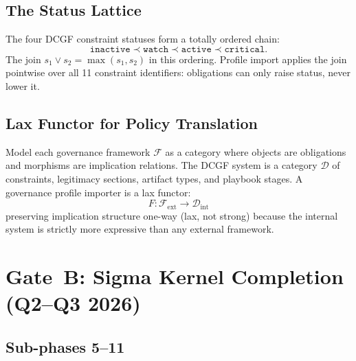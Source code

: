 \documentclass[11pt,letterpaper]{article}
\theoremstyle{remark}
\begin{document}
\subsection{The Status Lattice}

The four DCGF constraint statuses form a totally ordered chain:
\begin{equation}
  \texttt{inactive} \prec \texttt{watch} \prec \texttt{active} \prec \texttt{critical}.
  \label{eq:lattice}
\end{equation}
The join $s_1 \vee s_2 = \max(s_1, s_2)$ in this ordering. Profile
import applies the join pointwise over all 11 constraint identifiers:
obligations can only raise status, never lower it.

\subsection{Lax Functor for Policy Translation}

Model each governance framework $\mathcal{F}$ as a category where objects
are obligations and morphisms are implication relations. The DCGF system
is a category $\mathcal{D}$ of constraints, legitimacy sections, artifact
types, and playbook stages. A governance profile importer is a lax functor:
\begin{equation}
  F : \mathcal{F}_{\text{ext}} \to \mathcal{D}_{\text{int}}
  \label{eq:functor}
\end{equation}
preserving implication structure one-way (lax, not strong) because the
internal system is strictly more expressive than any external framework.

\section{Gate~B: Sigma Kernel Completion (Q2--Q3 2026)}

\subsection{Sub-phases 5--11}
\end{document}
